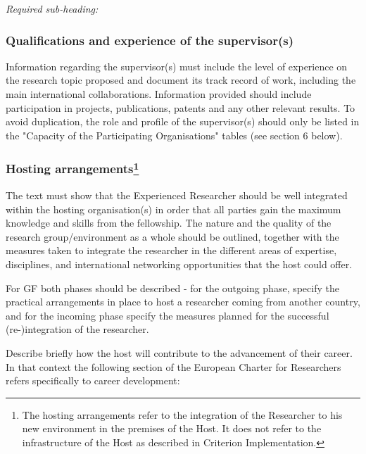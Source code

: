 \documentclass[a4paper,11pt]{article}
\begin{document}
{\em
Required sub-heading:
\subsubsection*{Qualifications and experience of the supervisor(s)}

Information regarding the supervisor(s) must include the level of experience on the research topic proposed and document its track record of work, including the main international collaborations. Information provided should include participation in projects, publications, patents and any other relevant results.
To avoid duplication, the role and profile of the supervisor(s) should only be listed in the "Capacity of the Participating Organisations" tables (see section 6 below). 

\subsubsection*{Hosting arrangements\footnote{The hosting arrangements refer to the integration of the Researcher to his new environment in the premises of the Host. It does not refer to the infrastructure of the Host as described in Criterion Implementation.}}
The text must show that the Experienced Researcher should be well integrated within the hosting organisation(s) in order that all parties gain the maximum knowledge and skills from the fellowship. The nature and the quality of the research group/environment as a whole should be outlined, together with the measures taken to integrate the researcher in the different areas of expertise, disciplines, and international networking opportunities that the host could offer.

For GF both phases should be described - for the outgoing phase, specify the practical arrangements in place to host a researcher coming from another country, and for the incoming phase specify the measures planned for the successful (re-)integration of the researcher.

Describe briefly how the host will contribute to the advancement of their career. In that context the following section of the European Charter for Researchers refers specifically to career development:
}
\end{document}
